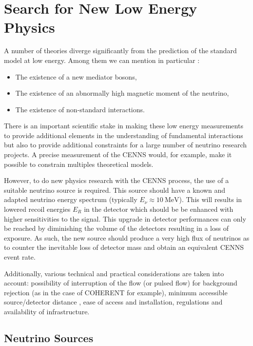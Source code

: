 \section{Search for New Low Energy Physics}

A number of theories diverge significantly from the prediction of the standard model at low energy. Among them we can mention in particular :
\begin{itemize}
	\item The existence of a new  mediator bosons,
	\item The existence of an abnormally high magnetic moment of the neutrino,
	\item The existence of non-standard interactions.
\end{itemize}

There is an important scientific stake in making these low energy measurements to provide additional elements in the understanding of fundamental interactions but also to provide additional constraints for a large number of neutrino research projects. A precise measurement of the CENNS would, for example, make it possible to constrain multiples theoretical models. 

However, to do new physics research with the CENNS process, the use of a suitable neutrino source is required. This source should have a known and adapted neutrino energy spectrum (typically $E_{\nu} \approx \SI{10}{\mega\eV}$). This will results in lowered recoil energies $E_R$ in the detector which should be be enhanced with higher sensitivities to the signal. This upgrade in detector performances can only be reached by diminishing the volume of the detectors resulting in a loss of exposure. As such, the new source should produce a very high flux of neutrinos as to counter the inevitable loss of detector mass and obtain an equivalent CENNS event rate.

Additionally, various technical and practical considerations are taken into account: possibility of interruption of the flow (or pulsed flow) for background rejection (as in the case of COHERENT for example), minimum accessible source/detector distance
, ease of access and installation, regulations and availability of infrastructure.

\subsection{Neutrino Sources}

